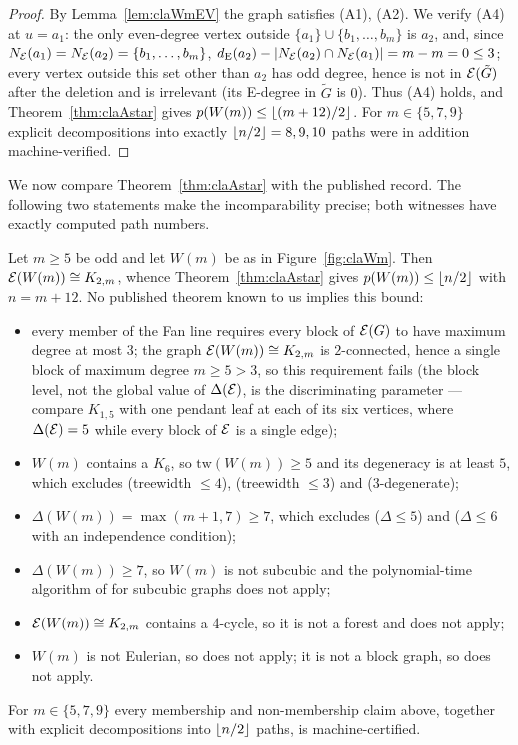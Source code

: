\begin{proof}
By Lemma~\ref{lem:claWmEV} the graph satisfies (A1), (A2). We verify (A4)
at $u=a_1$: the only even-degree vertex outside
$\{a_1\}\cup\{b_1,\dots,b_m\}$ is $a_2$, and, since
$N_{\mathcal{E}}(a_1)=N_{\mathcal{E}}(a_2)=\{b_1,\dots,b_m\}$,
$d_{\mathrm{E}}(a_2)-|N_{\mathcal{E}}(a_2)\cap N_{\mathcal{E}}(a_1)|=m-m=0\le3$; every vertex
outside this set other than $a_2$ has odd degree, hence is not in
$\mathcal{E}(\tilde G)$ after the deletion and is irrelevant (its E-degree in
$\tilde G$ is $0$). Thus (A4) holds, and Theorem~\ref{thm:claAstar} gives
$p(W(m))\le\left\lfloor (m+12)/2 \right\rfloor$. For $m\in\{5,7,9\}$ explicit
decompositions into exactly $\left\lfloor n/2 \right\rfloor=8,9,10$ paths were in addition
machine-verified.
\end{proof}

We now compare Theorem~\ref{thm:claAstar} with the published record. The
following two statements make the incomparability precise; both witnesses
have exactly computed path numbers.

\begin{proposition}[escape]\label{prop:claescape}
Let $m\ge5$ be odd and let $W(m)$ be as in Figure~\ref{fig:claWm}. Then
$\mathcal{E}(W(m))\cong K_{2,m}$, whence Theorem~\ref{thm:claAstar} gives
$p(W(m))\le\left\lfloor n/2 \right\rfloor$ with $n=m+12$. No published theorem known to us
implies this bound:
\begin{itemize}[leftmargin=1.5em]
\item every member of the Fan line \cite{Fan05,BS21,FHZ23} requires every
block of $\mathcal{E}(G)$ to have maximum degree at most $3$; the graph
$\mathcal{E}(W(m))\cong K_{2,m}$ is $2$-connected, hence a single block of maximum
degree $m\ge5>3$, so this requirement fails (the block level, not the
global value of $\Delta(\mathcal{E})$, is the discriminating parameter ---
compare $K_{1,5}$ with one pendant leaf at each of its six vertices, where
$\Delta(\mathcal{E})=5$ while every block of $\mathcal{E}$ is a single edge);
\item $W(m)$ contains a $K_6$, so $\mathrm{tw}(W(m))\ge5$ and its
degeneracy is at least $5$, which excludes \cite{LY24} (treewidth $\le4$),
\cite{BCLS20} (treewidth $\le3$) and \cite{ZLH24} ($3$-degenerate);
\item $\Delta(W(m))=\max(m+1,7)\ge7$, which excludes \cite{BP19}
($\Delta\le5$) and \cite{CFL} ($\Delta\le6$ with an independence
condition);
\item $\Delta(W(m))\ge7$, so $W(m)$ is not subcubic and the
polynomial-time algorithm of \cite{MY26} for subcubic graphs does not
apply;
\item $\mathcal{E}(W(m))\cong K_{2,m}$ contains a $4$-cycle, so it is not a forest
and \cite{Pyb96} does not apply;
\item $W(m)$ is not Eulerian, so \cite{FK88} does not apply; it is not a
block graph, so \cite{CW25} does not apply.
\end{itemize}
For $m\in\{5,7,9\}$ every membership and non-membership claim above,
together with explicit decompositions into $\left\lfloor n/2 \right\rfloor$ paths, is
machine-certified.
\end{proposition}

